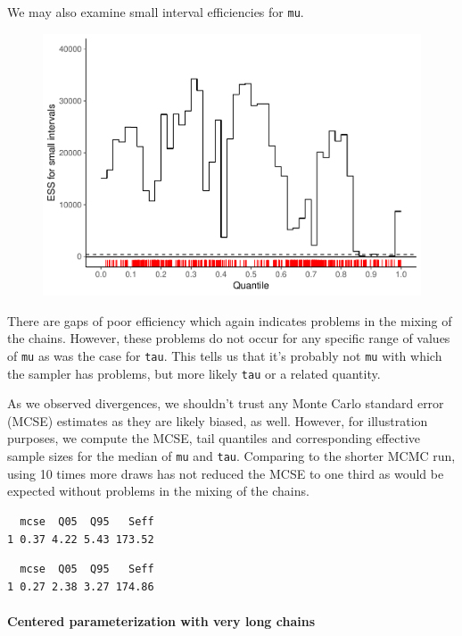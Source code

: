 \documentclass[american,]{article}
\let\oldparagraph\paragraph
\renewcommand{\paragraph}[1]{\oldparagraph{#1}\mbox{}}
\begin{document}
We may also examine small interval efficiencies for \texttt{mu}.

\begin{figure}[t]
  \centering
  \includegraphics[width=0.6\linewidth]{graphics/local-ess-fit-cp2-mu-1.pdf}
\end{figure}

There are gaps of poor efficiency which again indicates problems in the
mixing of the chains. However, these problems do not occur for any
specific range of values of \texttt{mu} as was the case for
\texttt{tau}. This tells us that it's probably not \texttt{mu} with
which the sampler has problems, but more likely \texttt{tau} or a
related quantity.

As we observed divergences, we shouldn't trust any Monte Carlo standard
error (MCSE) estimates as they are likely biased, as well. However, for
illustration purposes, we compute the MCSE, tail quantiles and
corresponding effective sample sizes for the median of \texttt{mu} and
\texttt{tau}. Comparing to the shorter MCMC run, using 10 times more
draws has not reduced the MCSE to one third as would be expected without
problems in the mixing of the chains.

\begin{verbatim}
  mcse  Q05  Q95   Seff
1 0.37 4.22 5.43 173.52
\end{verbatim}

\begin{verbatim}
  mcse  Q05  Q95   Seff
1 0.27 2.38 3.27 174.86
\end{verbatim}

\hypertarget{centered-parameterization-with-very-long-chains}{%
\paragraph{Centered parameterization with very long
chains}\label{centered-parameterization-with-very-long-chains}}
\end{document}
